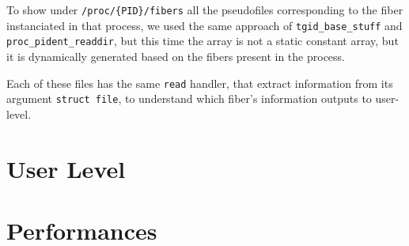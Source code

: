 \documentclass[a4paper]{article}
\begin{document}
To show under \texttt{/proc/\{PID\}/fibers} all the pseudofiles corresponding to the fiber instanciated in that process, we used the same approach of \texttt{tgid\_base\_stuff} and \texttt{proc\_pident\_readdir}, but this time the array is not a static constant array, but it is dynamically generated based on the fibers present in the process.

Each of these files has the same \texttt{read} handler, that extract information from its argument \texttt{struct file}, to understand which fiber's information outputs to user-level.

\section{User Level}



\section{Performances}
\end{document}

